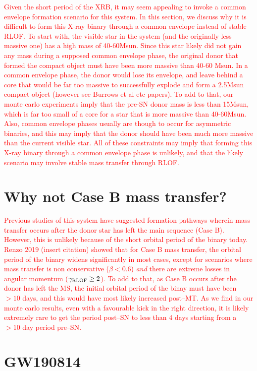 \documentclass[linenumbers,trackchanges,twocolumn]{aastex701}
\newcommand{\red}{\textcolor{red}}
\begin{document}
\red{Given the short period of the XRB, it may seem appealing to invoke a common envelope formation scenario for this system. In this section, we discuss why it is difficult to form this X-ray binary through a common envelope instead of stable RLOF. To start with, the visible star in the system (and the originally less massive one) has a high mass of 40-60Msun. Since this star likely did not gain any mass during a supposed common envelope phase, the original donor that formed the compact object must have been more massive than 40-60 Msun. In a common envelope phase, the donor would lose its envelope, and leave behind a core that would be far too massive to successfully explode and form a 2.5Msun compact object (however see Burrows et al etc papers). To add to that, our monte carlo experiments imply that the pre-SN donor mass is less than 15Msun, which is far too small of a core for a star that is more massive than 40-60Msun. Also, common envelope phases usually are though to occur for asymmetric binaries, and this may imply that the donor should have been much more massive than the current visible star. All of these constraints may imply that forming this X-ray binary through a common envelope phase is unlikely, and that the likely scenario may involve stable mass transfer through RLOF.}

\section{Why not Case B mass transfer?}

\red{Previous studies of this system have suggested formation pathways wherein mass transfer occurs after the donor star has left the main sequence (Case B). However, this is unlikely because of the short orbital period of the binary today. Renzo 2019 (insert citation) showed that for Case B mass transfer, the orbital period of the binary widens significantly in most cases, except for scenarios where mass transfer is non conservative ($\beta < 0.6$) \textit{and} there are extreme losses in angular momentum ($\gamma_{\rm RLOF} \geq 2$). To add to that, as Case B occurs after the donor has left the MS, the initial orbital period of the binay must have been $>10$ days, and this would have most likely increased post--MT. As we find in our monte carlo results, even with a favourable kick in the right direction, it is likely extremely rare to get the period post--SN to less than 4 days starting from a $>10$ day period pre--SN.}

\section{GW190814}
\end{document}
